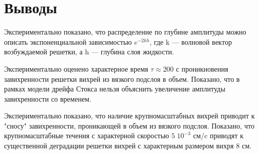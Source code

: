 \section{Выводы} \label{sect6_5}
Экспериментально показано, что распределение по глубине амплитуды можно описать
экспоненциальной зависимостью $e^{-2kh}$, где k — волновой вектор возбуждаемой решетки, а h — глубина слоя жидкости. 


Экспериментально оценено характерное время $\tau \approx 200$ с проникновения завихренности решетки вихрей из вязкого подслоя в объем. Показано, что в рамках модели дрейфа Стокса нельзя объяснить увеличение амплитуды завихренности со временем.

Экспериментально показано, что наличие крупномасштабных вихрей приводит к "сносу" завихренности, проникающей в объем из вязкого подслоя. Показано, что крупномасштабные течения с характерной скоростью $5 \; 10^{-3}$ см/c приводят к существенной деградации решетки вихрей с характерным размером вихря 8 см.
